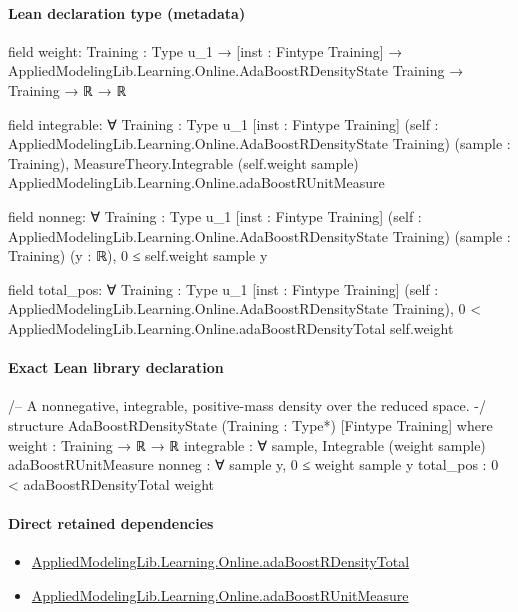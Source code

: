 \documentclass[10pt]{article}
\begin{document}
\paragraph{Lean declaration type (metadata)}
\begin{ReviewVerbatim}
field weight:
{Training : Type u_1} →
  [inst : Fintype Training] → AppliedModelingLib.Learning.Online.AdaBoostRDensityState Training → Training → ℝ → ℝ

field integrable:
∀ {Training : Type u_1} [inst : Fintype Training]
  (self : AppliedModelingLib.Learning.Online.AdaBoostRDensityState Training) (sample : Training),
  MeasureTheory.Integrable (self.weight sample) AppliedModelingLib.Learning.Online.adaBoostRUnitMeasure

field nonneg:
∀ {Training : Type u_1} [inst : Fintype Training]
  (self : AppliedModelingLib.Learning.Online.AdaBoostRDensityState Training) (sample : Training) (y : ℝ),
  0 ≤ self.weight sample y

field total_pos:
∀ {Training : Type u_1} [inst : Fintype Training]
  (self : AppliedModelingLib.Learning.Online.AdaBoostRDensityState Training),
  0 < AppliedModelingLib.Learning.Online.adaBoostRDensityTotal self.weight
\end{ReviewVerbatim}

\paragraph{Exact Lean library declaration}
\begin{ReviewVerbatim}
/-- A nonnegative, integrable, positive-mass density over the reduced space. -/
structure AdaBoostRDensityState (Training : Type*) [Fintype Training] where
  weight : Training → ℝ → ℝ
  integrable : ∀ sample, Integrable (weight sample) adaBoostRUnitMeasure
  nonneg : ∀ sample y, 0 ≤ weight sample y
  total_pos : 0 < adaBoostRDensityTotal weight
\end{ReviewVerbatim}

\paragraph{Direct retained dependencies}
\begin{itemize}\raggedright
\item \hyperlink{governing-declaration-3a7c5163ed3802f1}{Applied\allowbreak{}Modeling\allowbreak{}Lib.\allowbreak{}Learning.\allowbreak{}Online.\allowbreak{}ada\allowbreak{}Boost\allowbreak{}R\allowbreak{}Density\allowbreak{}Total}
\item \hyperlink{governing-declaration-7583f639e6f58620}{Applied\allowbreak{}Modeling\allowbreak{}Lib.\allowbreak{}Learning.\allowbreak{}Online.\allowbreak{}ada\allowbreak{}Boost\allowbreak{}R\allowbreak{}Unit\allowbreak{}Measure}
\end{itemize}
\end{document}
